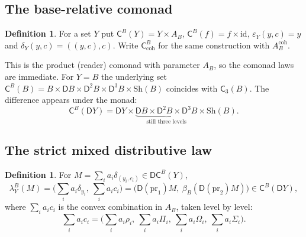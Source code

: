 \documentclass[11pt]{article}
\theoremstyle{definition}
\newtheorem{definition}[theorem]{Definition}
\theoremstyle{remark}
\newcommand{\D}{\mathsf{D}}
\newcommand{\Sh}{\mathrm{Sh}}
\newcommand{\C}{\mathsf{C}}
\newcommand{\id}{\mathrm{id}}
\begin{document}
\subsection{The base-relative comonad}

\begin{definition}
For a set $Y$ put $\C^B(Y)=Y\times A_B$, $\C^B(f)=f\times\id$,
$\varepsilon_Y(y,c)=y$ and $\delta_Y(y,c)=((y,c),c)$. Write $\C^B_{\mathrm{coh}}$ for the same
construction with $A^{\mathrm{coh}}_B$.
\end{definition}

This is the product (reader) comonad with parameter $A_B$, so the comonad laws are immediate. For
$Y=B$ the underlying set $\C^B(B)=B\times\D B\times\D^2B\times\D^3B\times\Sh(B)$ coincides with
$\C_3(B)$. The difference appears under the monad:
\[
\C^B(\D Y)=\D Y\times\underbrace{\D B\times\D^2B\times\D^3B}_{\text{still three levels}}\times\Sh(B).
\]

\subsection{The strict mixed distributive law}

\begin{definition}
For $M=\sum_ia_i\delta_{(y_i,c_i)}\in\D\C^B(Y)$,
\[
\lambda^B_Y(M)=\Big(\sum_ia_i\delta_{y_i},\ \sum_ia_ic_i\Big)
=\big(\D(\mathrm{pr}_1)M,\ \beta_B(\D(\mathrm{pr}_2)M)\big)\in\C^B(\D Y),
\]
where $\sum_ia_ic_i$ is the convex combination in $A_B$, taken level by level:
\[
\textstyle\sum_ia_ic_i=\big(\sum_i a_i\rho_i,\ \sum_i a_i\Pi_i,\ \sum_i a_i\Omega_i,\ \sum_i a_i\Sigma_i\big).
\]
\end{definition}
\end{document}
